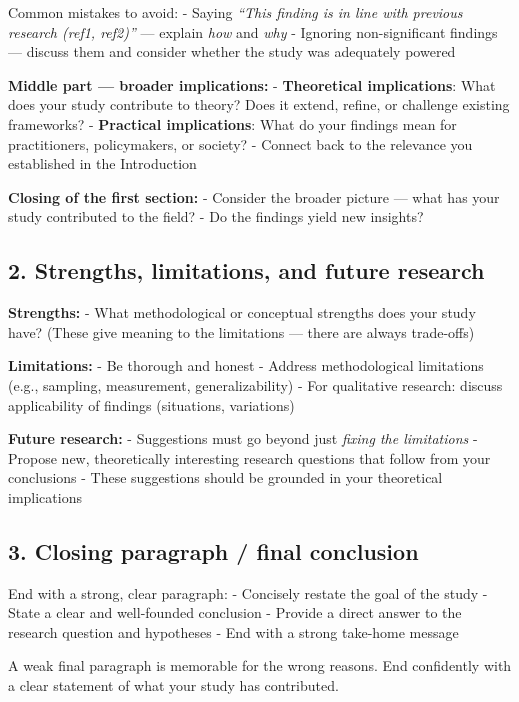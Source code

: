 \documentclass[
  11pt,
  a4paper,
]{scrbook}
\begin{document}
Common mistakes to avoid: - Saying \emph{``This finding is in line with
previous research (ref1, ref2)''} --- explain \emph{how} and \emph{why}
- Ignoring non-significant findings --- discuss them and consider
whether the study was adequately powered

\textbf{Middle part --- broader implications:} - \textbf{Theoretical
implications}: What does your study contribute to theory? Does it
extend, refine, or challenge existing frameworks? - \textbf{Practical
implications}: What do your findings mean for practitioners,
policymakers, or society? - Connect back to the relevance you
established in the Introduction

\textbf{Closing of the first section:} - Consider the broader picture
--- what has your study contributed to the field? - Do the findings
yield new insights?

\subsection{2. Strengths, limitations, and future
research}\label{strengths-limitations-and-future-research}

\textbf{Strengths:} - What methodological or conceptual strengths does
your study have? (These give meaning to the limitations --- there are
always trade-offs)

\textbf{Limitations:} - Be thorough and honest - Address methodological
limitations (e.g., sampling, measurement, generalizability) - For
qualitative research: discuss applicability of findings (situations,
variations)

\textbf{Future research:} - Suggestions must go beyond just \emph{fixing
the limitations} - Propose new, theoretically interesting research
questions that follow from your conclusions - These suggestions should
be grounded in your theoretical implications

\subsection{3. Closing paragraph / final
conclusion}\label{closing-paragraph-final-conclusion}

End with a strong, clear paragraph: - Concisely restate the goal of the
study - State a clear and well-founded conclusion - Provide a direct
answer to the research question and hypotheses - End with a strong
take-home message

\begin{tcolorbox}[enhanced jigsaw, bottomrule=.15mm, opacityback=0, toprule=.15mm, colframe=quarto-callout-warning-color-frame, left=2mm, rightrule=.15mm, title=\textcolor{quarto-callout-warning-color}{\faExclamationTriangle}\hspace{0.5em}{The discussion is the last thing readers read}, colbacktitle=quarto-callout-warning-color!10!white, bottomtitle=1mm, colback=white, breakable, toptitle=1mm, titlerule=0mm, leftrule=.75mm, arc=.35mm, opacitybacktitle=0.6, coltitle=black]

A weak final paragraph is memorable for the wrong reasons. End
confidently with a clear statement of what your study has contributed.

\end{tcolorbox}
\end{document}
